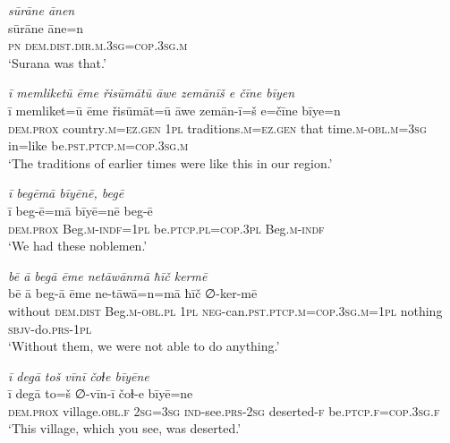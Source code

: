 \ea \label{RE.61}
\textit{sūrāne ānen} \\ 
\gll sūrāne āne=n \\ 
 \textsc{pn} \textsc{dem.dist}\textsc{.dir}\textsc{.m}\textsc{.3sg}\textsc{=cop}\textsc{.3sg}\textsc{.m} \\ 
\glt `Surana was that.'
\z 
 
\ea \label{RE.62}
\textit{ī memliketū ēme řisūmātū āwe zemānīš e čīne bīyen} \\ 
\gll ī memliket=ū ēme řisūmāt=ū āwe zemān-ī=š e=čīne bīye=n \\ 
 \textsc{dem.prox} country\textsc{.m}\textsc{=ez.gen} \textsc{1pl} traditions\textsc{.m}\textsc{=ez.gen} that time\textsc{.m}\textsc{-obl}\textsc{.m}\textsc{=3sg} in=like be\textsc{.pst}\textsc{.ptcp}\textsc{.m}\textsc{=cop}\textsc{.3sg}\textsc{.m} \\ 
\glt `The traditions of earlier times were like this in our region.'
\z 
 
\ea \label{RE.63}
\textit{ī begēmā bīyēnē, begē} \\ 
\gll ī beg-ē=mā bīyē=nē beg-ē \\ 
 \textsc{dem.prox} Beg\textsc{.m}\textsc{-indf}\textsc{=\textsc{1pl}} be\textsc{.ptcp}\textsc{.pl}\textsc{=cop}\textsc{.3pl} Beg\textsc{.m}\textsc{-indf} \\ 
\glt `We had these noblemen.'
\z 
 
\ea \label{RE.64}
\textit{bē ā begā ēme netāwānmā ħīč kermē} \\ 
\gll bē ā beg-ā ēme ne-tāwā=n=mā ħīč ∅-ker-mē \\ 
 without \textsc{dem.dist} Beg\textsc{.m}\textsc{-obl}\textsc{.pl} \textsc{1pl} \textsc{neg-}can\textsc{.pst}\textsc{.ptcp}\textsc{.m}\textsc{=cop}\textsc{.3sg}\textsc{.m}\textsc{=\textsc{1pl}} nothing \textsc{sbjv-}do\textsc{.prs}\textsc{-\textsc{1pl}} \\ 
\glt `Without them, we were not able to do anything.'
\z 
 
\ea \label{ŽE.4}
\textit{ī degā toš vīnī čoɫe bīyēne} \\ 
\gll ī degā to=š ∅-vīn-ī čoɫ-e bīyē=ne \\ 
 \textsc{dem.prox} village\textsc{.obl}\textsc{\textsc{.f}} \textsc{2sg}\textsc{=3sg} \textsc{ind-}see\textsc{.prs}-\textsc{2sg} deserted-\textsc{f} be\textsc{.ptcp}\textsc{\textsc{.f}}\textsc{=cop}\textsc{.3sg}\textsc{\textsc{.f}} \\ 
\glt `This village, which you see, was deserted.'
\z 
 

